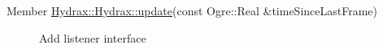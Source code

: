 \label{todo__todo000001}
\hypertarget{todo__todo000001}{}
 \begin{description}
\item[Member \hyperlink{class_hydrax_1_1_hydrax_c584e30a6cbfb5d8884afb182c29d36a}{Hydrax::Hydrax::update}(const Ogre::Real \&timeSinceLastFrame) ]Add listener interface \end{description}
